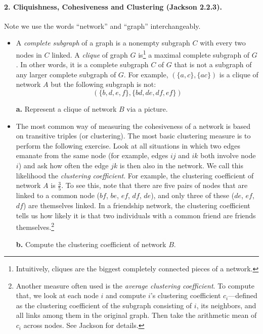 \documentclass[11pt]{article}
\theoremstyle{definition} \newtheorem{Theorem}{theorem}
\begin{document}
\paragraph{2. Cliquishness, Cohesiveness and Clustering (Jackson 2.2.3). } Note we use the words ``network'' and ``graph'' interchangeably.
\begin{itemize}
\item A \emph{complete subgraph} of a graph is a nonempty subgraph $C$ with every two nodes in $C$ linked. A \emph{clique} of graph $G$ is\footnote{Intuitively, cliques are the biggest completely connected pieces of a network.} a maximal complete subgraph of $G$. In other words, it is a complete subgraph $C$ of $G$ that is not a subgraph of any larger complete subgraph of $G$. For example, $(\{a,c\}, \{ac\})$ is a clique of network $A$ but the following subgraph is not: $$(\{b,d,e,f\}, \{bd,de,df,ef\})$$   

\item[\textbf{a.}] Represent a clique of network $B$ via a picture. 


\item The most common way of measuring the cohesiveness of a network is based on transitive triples (or clustering). The most basic clustering measure is to perform the following exercise. Look at all situations in which two edges emanate from the same node (for example, edges $ij$ and $ik$ both involve node $i$) and ask how often the edge $jk$ is then also in the network. We call this likelihood the \emph{clustering coefficient}. For example, the clustering coefficient of network $A$ is $\frac{3}{5}$. To see this, note that there are five pairs of nodes that are linked to a common node ($bf$, $be$, $ef$, $df$, $de$), and only three of these ($de$, $ef$, $df$) are themselves linked. In a friendship network, the clustering coefficient  tells us how likely it is that two individuals with a common friend are friends themselves.\footnote{Another measure often used is the  \emph{average clustering coefficient}. To compute that, we look at each node $i$ and compute $i$'s clustering coefficient $c_i$---defined as the clustering coefficient of the subgraph consisting of $i$, its neighbors, and all links among them in the original graph. Then take the arithmetic mean of $c_i$ across nodes. See Jackson for details.}  
\item [\textbf{b.}] Compute the clustering coefficient of network $B$. 
\end{itemize}
\end{document}
